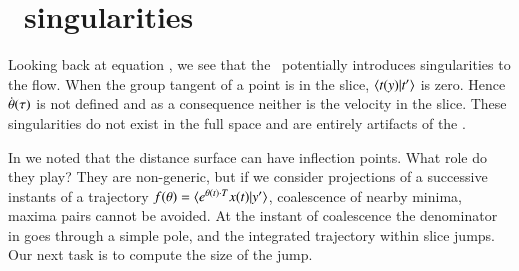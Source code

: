     \fi %
	
	
\section{\Slice\ singularities}
\label{sect:sliceSing}

Looking back at equation , we see that the \mslices\ potentially introduces singularities to the flow. When the group tangent of a point is in the slice, $\braket{\groupTan(\sspRed)}{\sliceTan{}}$ is zero. Hence  $\dot{{\bf \theta}}(\tau)$ is not defined and as a consequence neither is the velocity in the slice. These singularities do not exist in the full space and are entirely artifacts of the \mslices.

	\ifarticle
	\else
In  we noted that the distance surface 
 can have inflection points.
What role do they play? They are non-generic, but
if we consider projections of a successive instants of a trajectory
$f(\gSpace)=\braket{e^{\gSpace(t) \cdot \Lg} \ssp(t)}{\slicep}$, coalescence of
nearby minima, maxima pairs cannot be avoided. At the instant of coalescence
the denominator in  goes through a simple pole,
and the integrated trajectory within slice jumps. Our next task is
to compute the size of the jump.



